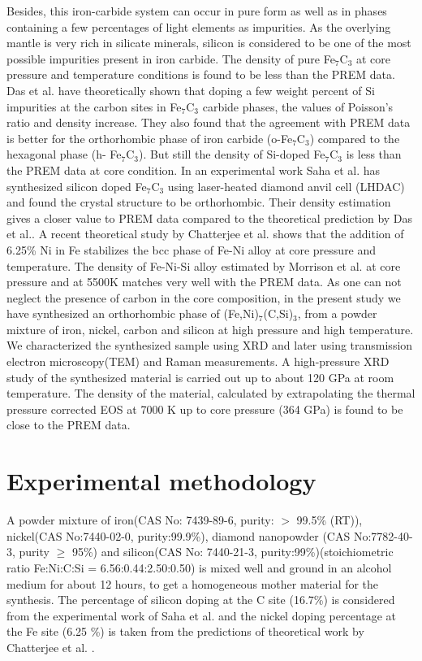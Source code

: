 \documentclass[prb,aps,preprint]{revtex4-2}
\begin{document}
Besides, this iron-carbide system can occur in pure form as well as in phases containing a few percentages of light elements as impurities. As the overlying mantle is very rich in silicate minerals, silicon is considered to be one of the most possible impurities present in iron carbide. The density of pure Fe$_{7}$C$_{3}$ at core pressure and temperature conditions is found to be less than the PREM data\cite{dziewonski1981preliminary, liu2016phase}. Das et al. \cite{das2017first} have theoretically shown that doping a few weight percent of Si impurities at the carbon sites in Fe$_{7}$C$_{3}$ carbide phases, the values of Poisson’s ratio and density increase. They also found that the agreement with PREM data is better for the orthorhombic phase of iron carbide (o-Fe$_{7}$C$_{3}$) compared to the hexagonal phase (h- Fe$_{7}$C$_{3}$). But still the density of Si-doped Fe$_{7}$C$_{3}$ is less than the PREM data at core condition. In an experimental work Saha et al. \cite{saha2021synthesis} has synthesized silicon doped Fe$_{7}$C$_{3}$ using laser-heated diamond anvil cell (LHDAC) and found the crystal structure to be orthorhombic. Their density estimation gives a closer value to PREM data compared to the theoretical prediction by Das et al.\cite{das2017first}.
A recent theoretical study by Chatterjee et al.\cite{chatterjee2021ni} shows that the addition of 6.25\% Ni in Fe stabilizes the bcc phase of Fe-Ni alloy at core pressure and temperature. The density of Fe-Ni-Si alloy estimated by Morrison et al. at core pressure and at 5500K matches very well with the PREM data\cite{morrison2018equations}.
As one can not neglect the presence of carbon in the core composition, in the present study we have synthesized an orthorhombic phase of (Fe,Ni)$_{7}$(C,Si)$_{3}$, from a powder mixture of iron, nickel, carbon and silicon at high pressure and high temperature. We characterized the synthesized sample using XRD and later using transmission electron microscopy(TEM) and Raman measurements. A high-pressure XRD study of the synthesized material is carried out up to about 120 GPa at room temperature. The density of the material, calculated by extrapolating the thermal pressure corrected EOS at 7000 K up to core pressure (364 GPa)  is found to be close to the PREM data.  
\\
\section{Experimental methodology}

A powder mixture of iron(CAS No: 7439-89-6, purity: $>$ 99.5\% (RT)), nickel(CAS No:7440-02-0, purity:99.9\%), diamond nanopowder (CAS No:7782-40-3, purity $\geq$ 95\%) and silicon(CAS No: 7440-21-3, purity:99\%)(stoichiometric ratio Fe:Ni:C:Si = 6.56:0.44:2.50:0.50) is mixed well and ground in an alcohol medium for about 12 hours, to get a homogeneous mother material for the synthesis. The percentage of silicon doping at the C site (16.7\%) is considered from the experimental work of Saha et al. \cite{saha2021synthesis} and the nickel doping percentage at the Fe site (6.25 \%) is taken from the predictions of theoretical work by Chatterjee et al. \cite{das2017first}. 
\end{document}
